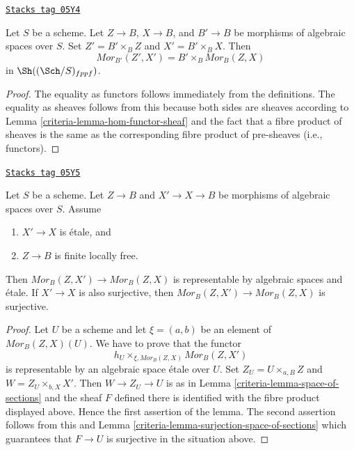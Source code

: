 \begin{lemma}
\label{criteria-lemma-base-change-hom-functor}
\href{https://stacks.math.columbia.edu/tag/05Y4}{\texttt{Stacks tag 05Y4}}

Let $S$ be a scheme. Let $Z \to B$, $X \to B$, and $B' \to B$
be morphisms of algebraic spaces over $S$. Set $Z' = B' \times_B Z$
and $X' = B' \times_B X$. Then
$$
\mathit{Mor}_{B'}(Z', X')
=
B' \times_B \mathit{Mor}_B(Z, X)
$$
in $\Sh((\Sch/S)_{fppf})$.
\end{lemma}

\begin{proof}

The equality as functors follows immediately from the definitions.
The equality as sheaves follows from this because both sides are
sheaves according to
Lemma \ref{criteria-lemma-hom-functor-sheaf}
and the fact that a fibre product of sheaves is the same as the
corresponding fibre product of pre-sheaves (i.e., functors).
\end{proof}

\begin{lemma}
\label{criteria-lemma-etale-covering-hom-functor}
\href{https://stacks.math.columbia.edu/tag/05Y5}{\texttt{Stacks tag 05Y5}}

Let $S$ be a scheme. Let $Z \to B$ and $X' \to X \to B$ be morphisms of
algebraic spaces over $S$. Assume
\begin{enumerate}
\item $X' \to X$ is \'etale, and
\item $Z \to B$ is finite locally free.
\end{enumerate}
Then $\mathit{Mor}_B(Z, X') \to \mathit{Mor}_B(Z, X)$ is representable
by algebraic spaces and \'etale. If $X' \to X$ is also surjective,
then $\mathit{Mor}_B(Z, X') \to \mathit{Mor}_B(Z, X)$ is surjective.
\end{lemma}

\begin{proof}

Let $U$ be a scheme and let $\xi = (a, b)$ be an element of
$\mathit{Mor}_B(Z, X)(U)$. We have to prove that the functor
$$
h_U \times_{\xi, \mathit{Mor}_B(Z, X)} \mathit{Mor}_B(Z, X')
$$
is representable by an algebraic space \'etale over $U$. Set
$Z_U = U \times_{a, B} Z$ and $W = Z_U \times_{b, X} X'$.
Then $W \to Z_U \to U$ is as in
Lemma \ref{criteria-lemma-space-of-sections}
and the sheaf $F$ defined there is identified with the fibre product
displayed above. Hence the first assertion of the lemma.
The second assertion follows from this and
Lemma \ref{criteria-lemma-surjection-space-of-sections}
which guarantees that $F \to U$ is surjective in the situation above.
\end{proof}


